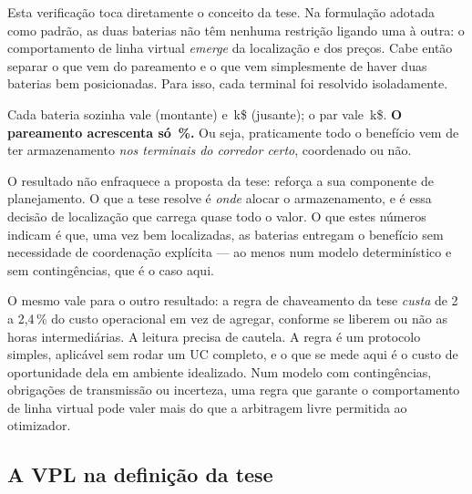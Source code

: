 \documentclass[11pt,a4paper]{article}
\begin{document}
Esta verificação toca diretamente o conceito da tese. Na formulação adotada como padrão, as duas
baterias não têm nenhuma restrição ligando uma à outra: o comportamento de linha virtual \emph{emerge} da
localização e dos preços. Cabe então separar o que vem do pareamento e o que vem simplesmente de haver
duas baterias bem posicionadas. Para isso, cada terminal foi resolvido isoladamente.

\begin{table}[htbp]
\centering\small
\caption{Decomposição do benefício da VPL (k\$/dia). ``Pareamento'' é o benefício do par menos a soma dos
benefícios de cada bateria sozinha.}
\tabdecomposicao
\end{table}

Cada bateria sozinha vale \numparup{} (montante) e \numpardn{}\,k\$ (jusante); o par vale
\numparpar{}\,k\$. \textbf{O pareamento acrescenta só \numpareamentopct{}\,\%.} Ou seja, praticamente todo
o benefício vem de ter armazenamento \emph{nos terminais do corredor certo}, coordenado ou não.

O resultado não enfraquece a proposta da tese: reforça a sua componente de planejamento. O que a tese
resolve é \emph{onde} alocar o armazenamento, e é essa decisão de localização que carrega quase todo o
valor. O que estes números indicam é que, uma vez bem localizadas, as baterias entregam o benefício sem
necessidade de coordenação explícita --- ao menos num modelo determinístico e sem contingências, que é o
caso aqui.

O mesmo vale para o outro resultado: a regra de chaveamento da tese \emph{custa} de 2 a 2{,}4\,\% do
custo operacional em vez de agregar, conforme se liberem ou não as horas intermediárias. A leitura precisa de cautela. A regra é um protocolo simples, aplicável sem rodar um UC completo,
e o que se mede aqui é o custo de oportunidade dela em ambiente idealizado. Num modelo com contingências,
obrigações de transmissão ou incerteza, uma regra que garante o comportamento de linha virtual pode valer
mais do que a arbitragem livre permitida ao otimizador.

\subsection{A VPL na definição da tese}
\label{sec:leituras}
\end{document}
